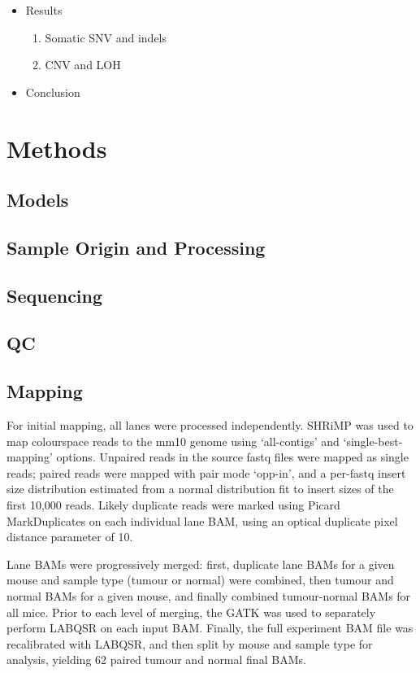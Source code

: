 \documentclass[thesis.tex]{subfiles}
\begin{document}
\begin{itemize}
  \item Results
  \begin{enumerate}
    \item Somatic SNV and indels
    \item CNV and LOH
  \end{enumerate}

  \item Conclusion
  
\end{itemize}

\section{Methods}

\subsection{Models}

\subsection{Sample Origin and Processing}

\subsection{Sequencing}

\subsection{QC}

\subsection{Mapping}

For initial mapping, all lanes were processed independently.  SHRiMP was used to map colourspace reads to the mm10 genome using `all-contigs' and `single-best-mapping' options.  Unpaired reads in the source fastq files were mapped as single reads; paired reads were mapped with pair mode `opp-in', and a per-fastq insert size distribution estimated from a normal distribution fit to insert sizes of the first 10,000 reads.  Likely duplicate reads were marked using Picard MarkDuplicates on each individual lane \gls{BAM}, using an optical duplicate pixel distance parameter of 10.

Lane \glspl{BAM} were progressively merged: first, duplicate lane \glspl{BAM} for a given mouse and sample type (tumour or normal) were combined, then tumour and normal \glspl{BAM} for a given mouse, and finally combined tumour-normal \glspl{BAM} for all mice.  Prior to each level of merging, the \gls{GATK} was used to separately perform \gls{LABQSR} on each input \gls{BAM}.  Finally, the full experiment \gls{BAM} file was recalibrated with \gls{LABQSR}, and then split by mouse and sample type for analysis, yielding 62 paired tumour and normal final \glspl{BAM}.
\end{document}
